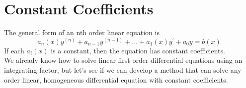 \section{Constant Coefficients}
The general form of an nth order linear equation is
\begin{equation*}
	a_n(x)y^{(n)} + a_{n-1}y^{(n-1)} + \ldots + a_1(x)y^\prime + a_0y = b(x)
\end{equation*}
If each $a_i(x)$ is a constant, then the equation has constant coefficients.\\

\noindent
We already know how to solve linear first order differential equations using an integrating factor, but let's see if we can develop a method that can solve any order linear, homogeneous differential equation with constant coefficients.

\ifodd{}\fi

